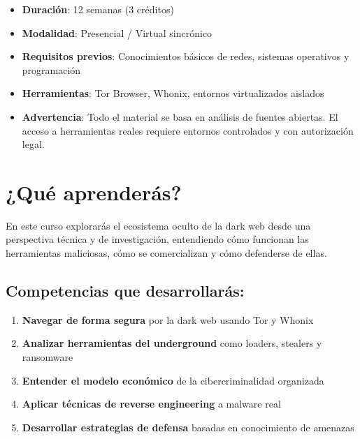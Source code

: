 \documentclass[
  letterpaper,
]{report}
\providecommand{\tightlist}{%
  \setlength{\itemsep}{0pt}\setlength{\parskip}{0pt}}
\begin{document}
\begin{tcolorbox}[enhanced jigsaw, arc=.35mm, bottomrule=.15mm, bottomtitle=1mm, breakable, colback=white, colbacktitle=quarto-callout-note-color!10!white, colframe=quarto-callout-note-color-frame, coltitle=black, left=2mm, leftrule=.75mm, opacityback=0, opacitybacktitle=0.6, rightrule=.15mm, title=\textcolor{quarto-callout-note-color}{\faInfo}\hspace{0.5em}{Información del Curso}, titlerule=0mm, toprule=.15mm, toptitle=1mm]

\begin{itemize}
\tightlist
\item
  \textbf{Duración}: 12 semanas (3 créditos)
\item
  \textbf{Modalidad}: Presencial / Virtual sincrónico
\item
  \textbf{Requisitos previos}: Conocimientos básicos de redes, sistemas
  operativos y programación
\item
  \textbf{Herramientas}: Tor Browser, Whonix, entornos virtualizados
  aislados
\item
  \textbf{Advertencia}: Todo el material se basa en análisis de fuentes
  abiertas. El acceso a herramientas reales requiere entornos
  controlados y con autorización legal.
\end{itemize}

\end{tcolorbox}

\section{¿Qué aprenderás?}\label{quuxe9-aprenderuxe1s}

En este curso explorarás el ecosistema oculto de la dark web desde una
perspectiva técnica y de investigación, entendiendo cómo funcionan las
herramientas maliciosas, cómo se comercializan y cómo defenderse de
ellas.

\subsection{Competencias que
desarrollarás:}\label{competencias-que-desarrollaruxe1s}

\begin{enumerate}
\def\labelenumi{\arabic{enumi}.}
\tightlist
\item
  \textbf{Navegar de forma segura} por la dark web usando Tor y Whonix
\item
  \textbf{Analizar herramientas del underground} como loaders, stealers
  y ransomware
\item
  \textbf{Entender el modelo económico} de la cibercriminalidad
  organizada
\item
  \textbf{Aplicar técnicas de reverse engineering} a malware real
\item
  \textbf{Desarrollar estrategias de defensa} basadas en conocimiento de
  amenazas
\end{enumerate}
\end{document}
